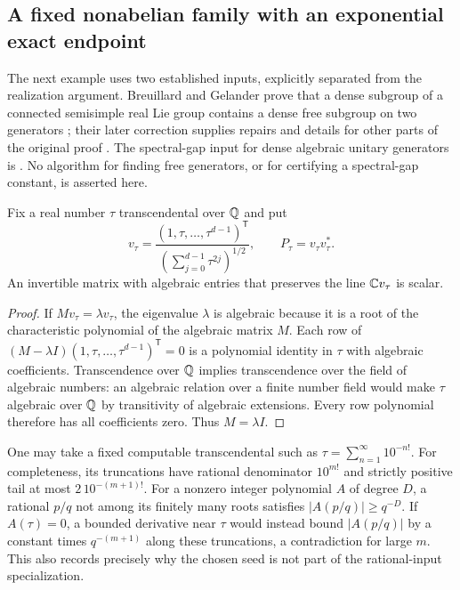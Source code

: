 \subsection{A fixed nonabelian family with an exponential exact endpoint}
The next example uses two established inputs, explicitly separated from
the realization argument. Breuillard and Gelander prove that a dense
subgroup of a connected semisimple real Lie group contains a dense free
subgroup on two generators \cite[Theorem~1.1]{BreuillardGelander57}; their
later correction supplies repairs and details for other parts of the
original proof \cite{BreuillardGelanderCorrection57}. The spectral-gap input
for dense algebraic unitary generators is \cite{BG2012}. No algorithm for
finding free generators, or for certifying a spectral-gap constant, is
asserted here.

\begin{lemma}
\label{lem:transcendentalseed57}
Fix a real number $\tau$ transcendental over $\mathbb Q$ and put
\[
 v_\tau=\frac{(1,\tau,\ldots,\tau^{d-1})^{\mathsf T}}
                  {(\sum_{j=0}^{d-1}\tau^{2j})^{1/2}},\qquad
 P_\tau=v_\tau v_\tau^*.
\]
An invertible matrix with algebraic entries that preserves the line
$\mathbb C v_\tau$ is scalar.
\end{lemma}
\begin{proof}
If $Mv_\tau=\lambda v_\tau$, the eigenvalue $\lambda$ is algebraic because
it is a root of the characteristic polynomial of the algebraic matrix $M$.
Each row of $(M-\lambda I)(1,\tau,\ldots,\tau^{d-1})^{\mathsf T}=0$ is a
polynomial identity in $\tau$ with algebraic coefficients. Transcendence
over $\mathbb Q$ implies transcendence over the field of algebraic numbers: an
algebraic relation over a finite number field would make $\tau$ algebraic
over $\mathbb Q$ by transitivity of algebraic extensions. Every row polynomial
therefore has all coefficients zero. Thus $M=\lambda I$.
\end{proof}
One may take a fixed computable transcendental such as
$\tau=\sum_{n=1}^\infty10^{-n!}$. For completeness, its truncations have
rational denominator $10^{m!}$ and strictly positive tail at most
$2\,10^{-(m+1)!}$. For a nonzero integer polynomial $A$ of degree $D$, a
rational $p/q$ not among its finitely many roots satisfies
$|A(p/q)|\ge q^{-D}$. If $A(\tau)=0$, a bounded derivative near $\tau$
would instead bound $|A(p/q)|$ by a constant times $q^{-(m+1)}$ along these
truncations, a contradiction for large $m$. This also records precisely
why the chosen seed is not part of the rational-input specialization.

